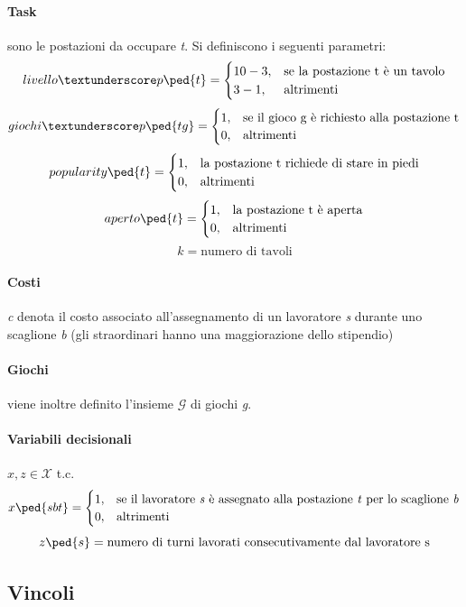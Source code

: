 \paragraph{Task} sono le postazioni da occupare \textit{t}.  Si definiscono i seguenti parametri:
\[
livello\textunderscore p\ped{t} = \begin{cases}
10-3,& \text{se la postazione t è un tavolo}  \\
3-1,& \text{altrimenti} 
\end{cases}
\]
\[
giochi\textunderscore p\ped{tg} = \begin{cases}
1,& \text{se il gioco g è richiesto alla postazione t}  \\
0,& \text{altrimenti}
\end{cases}
\]
\[
popularity\ped{t} = \begin{cases}
1,& \text{la postazione t richiede di stare in piedi}  \\
0,& \text{altrimenti}
\end{cases}
\]
\[
aperto\ped{t} = \begin{cases}
1,& \text{la postazione t è aperta}  \\
0,& \text{altrimenti}
\end{cases}
\]
\[
k = \text{numero di tavoli}
\]
\paragraph{Costi} \textit{c} denota il costo associato all'assegnamento di un lavoratore \textit{s} durante uno scaglione \textit{b} (gli straordinari hanno una maggiorazione dello stipendio)

\paragraph{Giochi} viene inoltre definito l'insieme $\mathcal{G}$ di giochi \textit{g}.

\paragraph{Variabili decisionali} $x,z \in \mathcal{X}$ t.c.
\[
x\ped{sbt} = \begin{cases}
1,& \text{se il lavoratore \textit{s} è assegnato alla postazione \textit{t} per lo scaglione \textit{b}}  \\
0,& \text{altrimenti}
\end{cases}
\]
\[
z\ped{s} = \text{numero di turni lavorati consecutivamente dal lavoratore s}
\]
\subsection{Vincoli}
